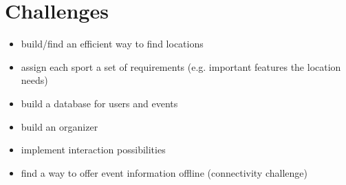 \documentclass[aspectratio=169]{beamer}
\begin{document}






\section{Challenges}
\begin{frame}
	\begin{itemize}
		\item build/find an efficient way to find locations
		\item assign each sport a set of requirements (e.g. important features the location needs)
		\item build a database for users and events
		\item build an organizer 
		\item implement interaction possibilities
		\item find a way to offer event information offline (connectivity challenge)
	\end{itemize}
\end{frame}
\end{document}
